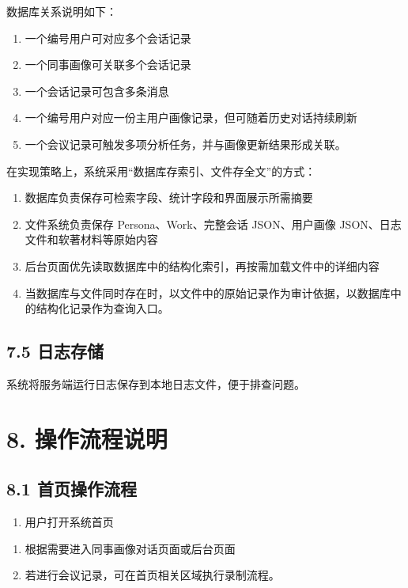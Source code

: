 \documentclass[12pt,a4paper]{article}
\begin{document}
\vspace{0.45em}
数据库关系说明如下：\par
\vspace{0.45em}
\begin{enumerate}
\item 一个编号用户可对应多个会话记录
\item 一个同事画像可关联多个会话记录
\item 一个会话记录可包含多条消息
\item 一个编号用户对应一份主用户画像记录，但可随着历史对话持续刷新
\item 一个会议记录可触发多项分析任务，并与画像更新结果形成关联。
\end{enumerate}
\vspace{0.45em}
在实现策略上，系统采用“数据库存索引、文件存全文”的方式：\par
\vspace{0.45em}
\begin{enumerate}
\item 数据库负责保存可检索字段、统计字段和界面展示所需摘要
\item 文件系统负责保存 Persona、Work、完整会话 JSON、用户画像 JSON、日志文件和软著材料等原始内容
\item 后台页面优先读取数据库中的结构化索引，再按需加载文件中的详细内容
\item 当数据库与文件同时存在时，以文件中的原始记录作为审计依据，以数据库中的结构化记录作为查询入口。
\end{enumerate}
\vspace{0.45em}
\subsection*{7.5 日志存储}
\vspace{0.45em}
系统将服务端运行日志保存到本地日志文件，便于排查问题。\par
\vspace{0.45em}
\section*{8. 操作流程说明}
\vspace{0.45em}
\subsection*{8.1 首页操作流程}
\vspace{0.45em}
\begin{enumerate}
\item 用户打开系统首页
\end{enumerate}
\newpage
{}
\fancyhead[R]{}
\begin{enumerate}
\item 根据需要进入同事画像对话页面或后台页面
\item 若进行会议记录，可在首页相关区域执行录制流程。
\end{enumerate}
\vspace{0.45em}
\end{document}
